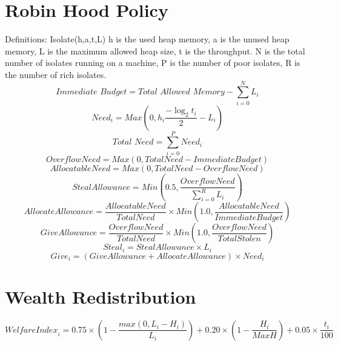 \documentclass{l4proj}
\begin{document}
\section{Robin Hood Policy}
Definitions: Isolate(h,a,t,L) h is the used heap memory, a is the unused heap memory, L is the maximum allowed heap size, t is the throughput. N is the total number of isolates running on a machine, P is the number of poor isolates, R is the number of rich isolates. 
\begin{equation}
\textit{Immediate Budget} = \textit{Total Allowed Memory} - \sum_{i=0}^{N}L_i
\end{equation}
\begin{equation}
Need_i     = Max(0,h_i \frac{-\log_2{t_i}}{2} - L_i)
\end{equation}
\begin{equation}
\textit{Total Need} = \sum_{i=0}^{P}Need_i
\end{equation}
\begin{equation}
\textit{OverflowNeed}     = Max(0,\textit{TotalNeed} - \textit{ImmediateBudget}) 
\end{equation}
\begin{equation}
\textit{AllocatableNeed}     = Max(0,\textit{TotalNeed} - \textit{OverflowNeed}) 
\end{equation}
\begin{equation}
\textit{StealAllowance} = Min(0.5,\frac{\textit{OverflowNeed}}{\sum_{i=0}^{R}L_i}) 
\end{equation}
\begin{equation}
\textit{AllocateAllowance} = \frac{\textit{AllocatableNeed}}{\textit{TotalNeed}} \times Min(1.0,\frac{\textit{AllocatableNeed}}{\textit{ImmediateBudget}}) 
\end{equation}
\begin{equation}
\textit{GiveAllowance} = \frac{\textit{OverflowNeed}}{\textit{TotalNeed}} \times Min(1.0,\frac{\textit{OverflowNeed}}{\textit{TotalStolen}}) 
\end{equation}
\begin{equation}
Steal_i = \textit{StealAllowance} \times L_i 
\end{equation}
\begin{equation}
Give_i = (\textit{GiveAllowance} + \textit{AllocateAllowance}) \times Need_i 
\end{equation}

\section{Wealth Redistribution}
\begin{equation}
\textit{WelfareIndex}_i = 0.75\times (1 - \frac{max(0,L_i - H_i)}{L_i})+0.20\times (1 - \frac{H_i}{\textit{MaxH}})+0.05\times \frac{t_i}{100}
\end{equation}
\end{document}
